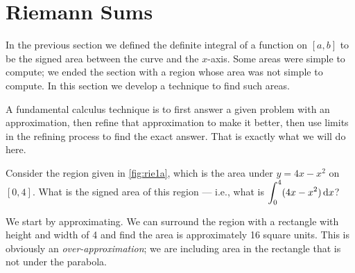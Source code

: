 \section{Riemann Sums}\label{sec:riemann}

In the previous section we defined the definite integral of a function on $[a,b]$ to be the signed area between the curve and the $x$-axis. Some areas were simple to compute; we ended the section with a region whose area was not simple to compute. In this section we develop a technique to find such areas.

A fundamental calculus technique is to first answer a given problem with an approximation, then refine that approximation to make it better, then use limits in the refining process to find the exact answer. That is exactly what we will do here.

Consider the region given in \autoref{fig:rie1a}, which is the area under $y=4x-x^2$ on $[0,4]$. What is the signed area of this region --- i.e., what is $\displaystyle\int_0^4(4x-x^2)\operatorname{d}\! x$?


We start by approximating. We can surround the region with a rectangle with height and width of 4 and find the area is approximately 16 square units. This is obviously an \emph{over-approximation}; we are including area in the rectangle that is not under the parabola. 


